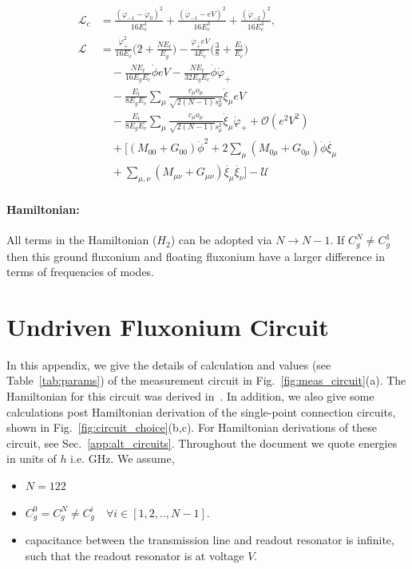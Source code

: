 \documentclass[%
reprint,
superscriptaddress,
 amsmath,amssymb,
 aps,
 prx,
longbibliography,
floatfix,
]{revtex4-2}
\begin{document}
\begin{align}
    \mathcal{L}_{c}&=\frac{(\dot{\varphi}_{-1}-\dot{\varphi}_{0})^2}{16E^1_{c}}+\frac{(\dot{\varphi}_{-1}-eV)^2}{16E^3_{c}}+\frac{(\dot{\varphi}_{-2})^2}{16E^4_{c}},\\
 \mathcal{L}&=\frac{\dot{\varphi}_{+}^2}{16E_c}\Big(2+\frac{NE_t}{E_g}\Big)-\frac{\dot{\varphi}_{+}eV}{4E_c}\Big(\frac{3}{8}+\frac{E_t}{E_c}\Big)\nonumber\\
    &\quad-\frac{NE_t}{16E_gE_c}\dot{\phi}eV-\frac{NE_t}{32E_gE_c}\dot{\phi}\dot{\varphi}_{+}\\
    &\quad -\frac{E_t}{8E_gE_c} \sum_\mu\frac{c_\mu o_\mu}{\sqrt{2(N-1)}s_\mu^2}  \dot{\xi}_\mu eV\nonumber\\
    &\quad-\frac{E_t}{8E_gE_c} \sum_\mu\frac{c_\mu o_\mu}{\sqrt{2(N-1)}s_\mu^2}  \dot{\xi}_\mu\dot{\varphi}_{+}+\mathcal{O}(e^2V^2)\\
    &\quad+\Big[(M_{00}+G_{00})\dot{\phi}^2+2\sum_{\mu}(M_{0\mu}+G_{0\mu})\dot{\phi}\dot{\xi_\mu}\nonumber\\
    &\quad+\sum_{\mu,\nu}(M_{\mu\nu}+G_{\mu\nu})\dot{\xi_\mu}\dot{\xi_\nu}\Big]-\mathcal{U}
\end{align}

\paragraph{Hamiltonian:} All terms in the Hamiltonian ($H_2$) can be adopted via $N\rightarrow N-1$. If $C_g^N\neq C_g^1$ then this ground fluxonium and floating fluxonium have a larger difference in terms of frequencies of modes.
\section{Undriven Fluxonium Circuit}\label{app:Hamiltonian}
In this appendix, we give the details of calculation and values (see Table~\ref{tab:params}) of the measurement circuit in Fig.~\ref{fig:meas_circuit}(a). The Hamiltonian for this circuit was derived in~\cite{viola2015collective}. In addition, we also give some calculations post Hamiltonian derivation of the single-point connection circuits, shown in Fig.~\ref{fig:circuit_choice}(b,c). For Hamiltonian derivations of these circuit, see Sec.~\ref{app:alt_circuits}. Throughout the document we quote energies in units of $h$ i.e. GHz. We assume,
\begin{itemize}
    \item $N=122$ 
    \item $C_g^0=C_g^N\neq C_g^i \quad \forall i\in[1,2,..,N-1]$.
    \item capacitance between the transmission line and readout resonator is infinite, such that the readout resonator is at voltage $V$.
\end{itemize}
\end{document}
